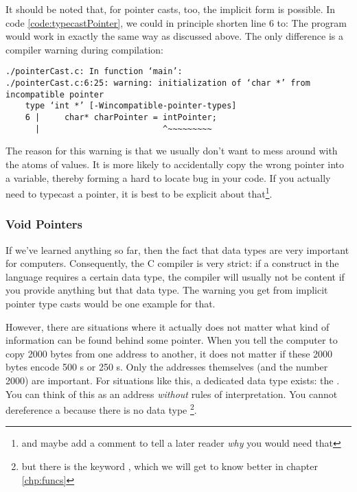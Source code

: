 {It should be noted that, for pointer casts, too, the implicit form is possible. In code \ref{code:typecastPointer}, we could in principle shorten line 6 to:
The program would work in exactly the same way as discussed above. The only difference is a compiler warning during compilation:
\begin{cmdbox}
\begin{verbatim}
./pointerCast.c: In function ‘main’:
./pointerCast.c:6:25: warning: initialization of ‘char *’ from incompatible pointer 
    type ‘int *’ [-Wincompatible-pointer-types]
    6 |     char* charPointer = intPointer;
      |                         ^~~~~~~~~~
\end{verbatim}
\end{cmdbox}

The reason for this warning is that we usually don't want to mess around with the atoms of values. It is more likely to accidentally copy the wrong pointer into a variable, thereby forming a hard to locate bug in your code. If you actually need to typecast a pointer, it is best to be explicit about that\footnote{and maybe add a comment to tell a later reader \emph{why} you would need that}.

\subsubsection{Void Pointers}
If we've learned anything so far, then the fact that data types are very important for computers. Consequently, the C compiler is very strict: if a construct in the language requires a certain data type, the compiler will usually not be content if you provide anything but that data type. The warning you get from implicit pointer type casts would be one example for that.

However, there are situations where it actually does not matter what kind of information can be found behind some pointer. When you tell the computer to copy 2000 bytes from one address to another, it does not matter if these 2000 bytes encode 500 s or 250 s. Only the addresses themselves (and the number 2000) are important. For situations like this, a dedicated data type exists: the . You can think of this as an address \emph{without} rules of interpretation. You cannot dereference a  because there is no data type \footnote{but there is the keyword , which we will get to know better in chapter \ref{chp:funcs}}.

}
